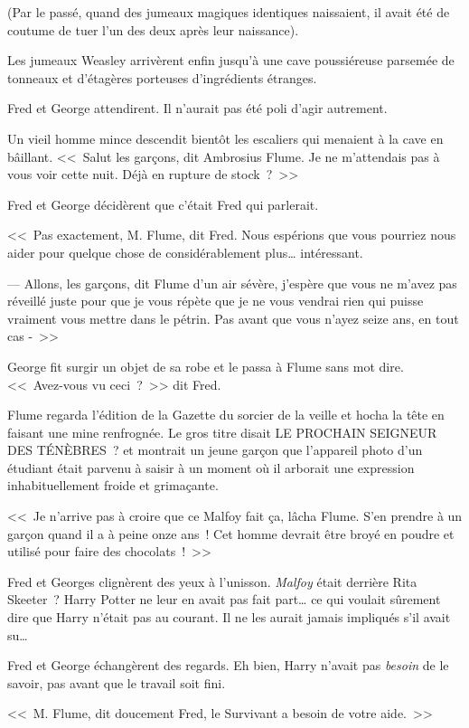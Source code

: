 (Par le passé, quand des jumeaux magiques identiques naissaient, il avait été de coutume de tuer l'un des deux après leur naissance).

Les jumeaux Weasley arrivèrent enfin jusqu'à une cave poussiéreuse parsemée de tonneaux et d'étagères porteuses d'ingrédients étranges.

Fred et George attendirent. Il n'aurait pas été poli d'agir autrement.

Un vieil homme mince descendit bientôt les escaliers qui menaient à la cave en bâillant. <<~Salut les garçons, dit Ambrosius Flume. Je ne m'attendais pas à vous voir cette nuit. Déjà en rupture de stock~?~>>

Fred et George décidèrent que c'était Fred qui parlerait.

<<~Pas exactement, M. Flume, dit Fred. Nous espérions que vous pourriez nous aider pour quelque chose de considérablement plus… intéressant.

--- Allons, les garçons, dit Flume d'un air sévère, j'espère que vous ne m'avez pas réveillé juste pour que je vous répète que je ne vous vendrai rien qui puisse vraiment vous mettre dans le pétrin. Pas avant que vous n'ayez seize ans, en tout cas -~>>

George fit surgir un objet de sa robe et le passa à Flume sans mot dire. <<~Avez-vous vu ceci~?~>> dit Fred.

Flume regarda l'édition de la Gazette du sorcier de la veille et hocha la tête en faisant une mine renfrognée. Le gros titre disait LE PROCHAIN SEIGNEUR DES TÉNÈBRES~? et montrait un jeune garçon que l'appareil photo d'un étudiant était parvenu à saisir à un moment où il arborait une expression inhabituellement froide et grimaçante.

<<~Je n'arrive pas à croire que ce Malfoy fait ça, lâcha Flume. S'en prendre à un garçon quand il a à peine onze ans~! Cet homme devrait être broyé en poudre et utilisé pour faire des chocolats~!~>>

Fred et Georges clignèrent des yeux à l'unisson. \emph{Malfoy} était derrière Rita Skeeter~? Harry Potter ne leur en avait pas fait part… ce qui voulait sûrement dire que Harry n'était pas au courant. Il ne les aurait jamais impliqués s'il avait su…

Fred et George échangèrent des regards. Eh bien, Harry n'avait pas \emph{besoin} de le savoir, pas avant que le travail soit fini.

<<~M. Flume, dit doucement Fred, le Survivant a besoin de votre aide.~>>

